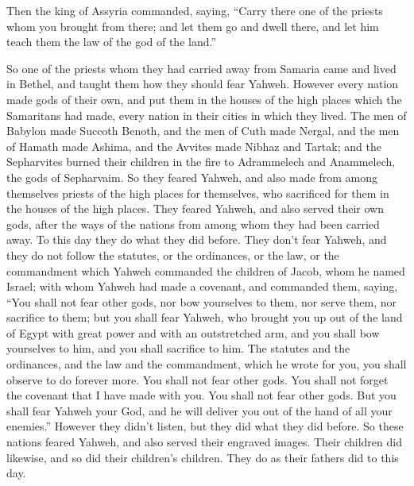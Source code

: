 {\par }{\PP {}Then the king of Assyria commanded, saying, “Carry there one of the priests whom you brought from there; and let them go and dwell there, and let him teach them the law of the god of the land.”
\par }{\PP {}So one of the priests whom they had carried away from Samaria came and lived in Bethel, and taught them how they should fear Yahweh.
However every nation made gods of their own, and put them in the houses of the high places which the Samaritans had made, every nation in their cities in which they lived.
The men of Babylon made Succoth Benoth, and the men of Cuth made Nergal, and the men of Hamath made Ashima,
and the Avvites made Nibhaz and Tartak; and the Sepharvites burned their children in the fire to Adrammelech and Anammelech, the gods of Sepharvaim.
So they feared Yahweh, and also made from among themselves priests of the high places for themselves, who sacrificed for them in the houses of the high places.
They feared Yahweh, and also served their own gods, after the ways of the nations from among whom they had been carried away.
To this day they do what they did before. They don’t fear Yahweh, and they do not follow the statutes, or the ordinances, or the law, or the commandment which Yahweh commanded the children of Jacob, whom he named Israel;
with whom Yahweh had made a covenant, and commanded them, saying, “You shall not fear other gods, nor bow yourselves to them, nor serve them, nor sacrifice to them;
but you shall fear Yahweh, who brought you up out of the land of Egypt with great power and with an outstretched arm, and you shall bow yourselves to him, and you shall sacrifice to him.
The statutes and the ordinances, and the law and the commandment, which he wrote for you, you shall observe to do forever more. You shall not fear other gods.
You shall not forget the covenant that I have made with you. You shall not fear other gods.
But you shall fear Yahweh your God, and he will deliver you out of the hand of all your enemies.”
However they didn’t listen, but they did what they did before.
So these nations feared Yahweh, and also served their engraved images. Their children did likewise, and so did their children’s children. They do as their fathers did to this day.

}
